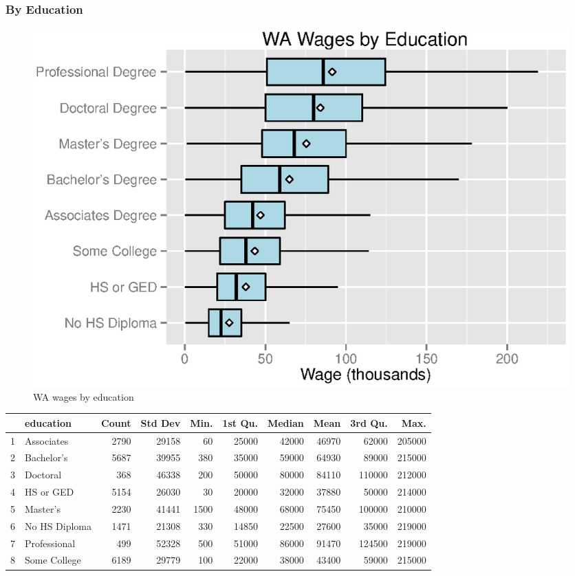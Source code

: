 \documentclass{exam}
\begin{document}
  \subsubsection{By Education}
  \begin{figure}[H]
    \centering
    \includegraphics{figures/wa_wage_by_education.eps}
    \caption{WA wages by education}
  \end{figure}

  \begin{table}[ht]
    \centering
    \begin{tabular}{rlrrrrrrrr}
      \toprule
        & education     & Count & Std Dev & Min. & 1st Qu. & Median & Mean  & 3rd Qu. & Max. \\
      \midrule
      1 & Associates    & 2790  & 29158   & 60   & 25000   & 42000  & 46970 & 62000   & 205000 \\
      2 & Bachelor's    & 5687  & 39955   & 380  & 35000   & 59000  & 64930 & 89000   & 215000 \\
      3 & Doctoral      & 368   & 46338   & 200  & 50000   & 80000  & 84110 & 110000  & 212000 \\
      4 & HS or GED     & 5154  & 26030   & 30   & 20000   & 32000  & 37880 & 50000   & 214000 \\
      5 & Master's      & 2230  & 41441   & 1500 & 48000   & 68000  & 75450 & 100000  & 210000 \\
      6 & No HS Diploma & 1471  & 21308   & 330  & 14850   & 22500  & 27600 & 35000   & 219000 \\
      7 & Professional  & 499   & 52328   & 500  & 51000   & 86000  & 91470 & 124500  & 219000 \\
      8 & Some College  & 6189  & 29779   & 100  & 22000   & 38000  & 43400 & 59000   & 215000 \\
      \midrule
    \end{tabular}
  \end{table}
\end{document}

